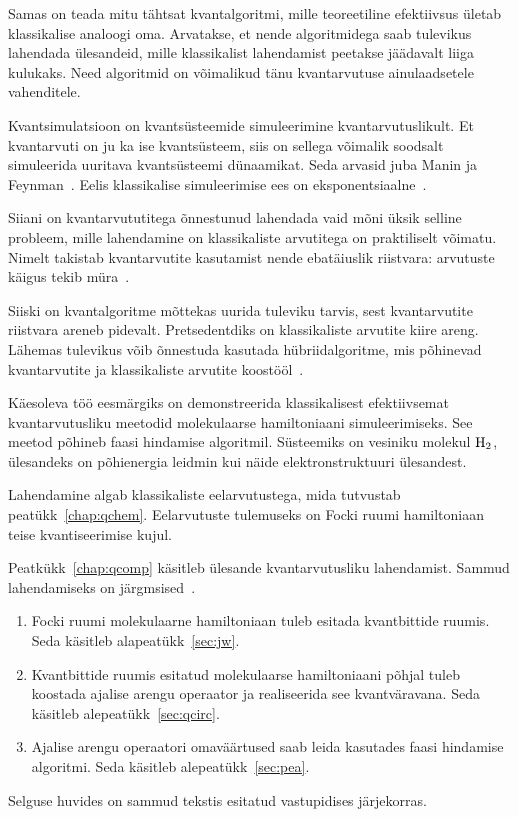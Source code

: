 \documentclass[12pt]{report}
\begin{document}
Samas on teada mitu tähtsat kvantalgoritmi, mille teoreetiline efektiivsus ületab klassikalise analoogi oma.
Arvatakse, et nende algoritmidega saab tulevikus lahendada ülesandeid, mille klassikalist lahendamist peetakse jäädavalt liiga kulukaks.
Need algoritmid on võimalikud tänu kvantarvutuse ainulaadsetele vahenditele.

Kvantsimulatsioon on kvantsüsteemide simuleerimine kvantarvutuslikult.
Et kvantarvuti on ju ka ise kvantsüsteem, siis on sellega võimalik soodsalt simuleerida uuritava kvantsüsteemi dünaamikat.
Seda arvasid juba Manin ja Feynman~\cite{manin, feynman}.
Eelis klassikalise simuleerimise ees on eksponentsiaalne~\cite{whitfield+etal2011, mcardle+etal, cao+etal}.

Siiani on kvantarvututitega õnnestunud lahendada vaid mõni üksik selline probleem, mille lahendamine on klassikaliste arvutitega on praktiliselt võimatu.
Nimelt takistab kvantarvutite kasutamist nende ebatäiuslik riistvara: arvutuste käigus tekib müra~\cite{whitfield+etal2022}.

Siiski on kvantalgoritme mõttekas uurida tuleviku tarvis, sest kvantarvutite riistvara areneb pidevalt.
Pretsedentdiks on klassikaliste arvutite kiire areng.
Lähemas tulevikus võib õnnestuda kasutada hübriidalgoritme, mis põhinevad kvantarvutite ja klassikaliste arvutite koostööl~\cite{omalley+etal}.

Käesoleva töö eesmärgiks on demonstreerida klassikalisest efektiivsemat kvantarvutusliku meetodid molekulaarse hamiltoniaani simuleerimiseks.
See meetod põhineb faasi hindamise algoritmil.
Süsteemiks on vesiniku molekul \(\rm H_2\), ülesandeks on põhienergia leidmin kui näide elektronstruktuuri ülesandest.

Lahendamine algab klassikaliste eelarvutustega, mida tutvustab peatükk~\ref{chap:qchem}.
Eelarvutuste tulemuseks on Focki ruumi hamiltoniaan teise kvantiseerimise kujul.

Peatkükk~\ref{chap:qcomp} käsitleb ülesande kvantarvutusliku lahendamist.
Sammud lahendamiseks on järgmsised~\cite{whitfield+etal2011}.

\begin{enumerate}
    \item Focki ruumi molekulaarne hamiltoniaan tuleb esitada kvantbittide ruumis.
    Seda käsitleb alapeatükk~\ref{sec:jw}.
    \item Kvantbittide ruumis esitatud molekulaarse hamiltoniaani põhjal tuleb koostada ajalise arengu operaator ja realiseerida see kvantväravana.
    Seda käsitleb alepeatükk~\ref{sec:qcirc}.
    \item Ajalise arengu operaatori omaväärtused saab leida kasutades faasi hindamise algoritmi.
    Seda käsitleb alepeatükk~\ref{sec:pea}.
\end{enumerate}
Selguse huvides on sammud tekstis esitatud vastupidises järjekorras.
\end{document}
